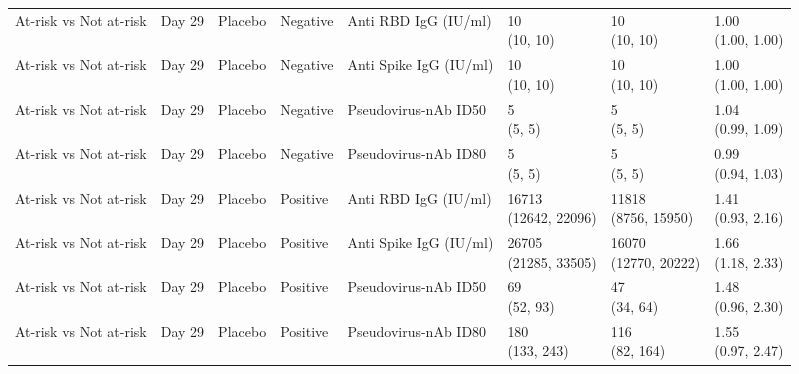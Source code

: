 \documentclass[]{book}
\theoremstyle{definition}
\theoremstyle{definition}
\theoremstyle{definition}
\newcommand{\1}{\mathbbm{1}}
\begin{document}
\begin{landscape}
\begin{ThreePartTable}
\begin{longtable}[t]{>{\raggedright\arraybackslash}p{2.7cm}lllllll}
At-risk vs Not at-risk & Day 29 & Placebo & Negative & Anti RBD IgG (IU/ml) & \makecell[l]{10\\(10, 10)} & \makecell[l]{10\\(10, 10)} & \makecell[l]{1.00\\(1.00, 1.00)}\\
At-risk vs Not at-risk & Day 29 & Placebo & Negative & Anti Spike IgG (IU/ml) & \makecell[l]{10\\(10, 10)} & \makecell[l]{10\\(10, 10)} & \makecell[l]{1.00\\(1.00, 1.00)}\\
At-risk vs Not at-risk & Day 29 & Placebo & Negative & Pseudovirus-nAb ID50 & \makecell[l]{5\\(5, 5)} & \makecell[l]{5\\(5, 5)} & \makecell[l]{1.04\\(0.99, 1.09)}\\
\addlinespace
At-risk vs Not at-risk & Day 29 & Placebo & Negative & Pseudovirus-nAb ID80 & \makecell[l]{5\\(5, 5)} & \makecell[l]{5\\(5, 5)} & \makecell[l]{0.99\\(0.94, 1.03)}\\
At-risk vs Not at-risk & Day 29 & Placebo & Positive & Anti RBD IgG (IU/ml) & \makecell[l]{16713\\(12642, 22096)} & \makecell[l]{11818\\(8756, 15950)} & \makecell[l]{1.41\\(0.93, 2.16)}\\
At-risk vs Not at-risk & Day 29 & Placebo & Positive & Anti Spike IgG (IU/ml) & \makecell[l]{26705\\(21285, 33505)} & \makecell[l]{16070\\(12770, 20222)} & \makecell[l]{1.66\\(1.18, 2.33)}\\
At-risk vs Not at-risk & Day 29 & Placebo & Positive & Pseudovirus-nAb ID50 & \makecell[l]{69\\(52, 93)} & \makecell[l]{47\\(34, 64)} & \makecell[l]{1.48\\(0.96, 2.30)}\\
At-risk vs Not at-risk & Day 29 & Placebo & Positive & Pseudovirus-nAb ID80 & \makecell[l]{180\\(133, 243)} & \makecell[l]{116\\(82, 164)} & \makecell[l]{1.55\\(0.97, 2.47)}\\

\end{longtable}
\end{ThreePartTable}
\end{landscape}
\end{document}
